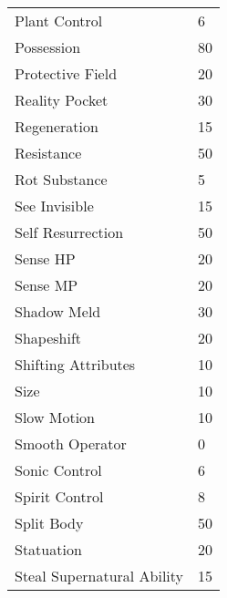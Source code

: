 \documentclass[twoside]{book}
\begin{document}
\begin{longtable}{p{1.25in}l}
  \raggedright
           Plant Control 
  &
   6 
  \tabularnewline
      
  \raggedright
           Possession 
  &
   80 
  \tabularnewline
      
  \raggedright
           Protective Field 
  &
   20 
  \tabularnewline
      
  \raggedright
           Reality Pocket 
  &
   30 
  \tabularnewline
      
  \raggedright
           Regeneration 
  &
   15 
  \tabularnewline
      
  \raggedright
           Resistance 
  &
   50 
  \tabularnewline
      
  \raggedright
           Rot Substance 
  &
   5 
  \tabularnewline
      
  \raggedright
           See Invisible 
  &
   15 
  \tabularnewline
      
  \raggedright
           Self Resurrection 
  &
   50 
  \tabularnewline
      
  \raggedright
           Sense HP 
  &
   20 
  \tabularnewline
      
  \raggedright
           Sense MP 
  &
   20 
  \tabularnewline
      
  \raggedright
           Shadow Meld 
  &
   30 
  \tabularnewline
      
  \raggedright
           Shapeshift 
  &
   20 
  \tabularnewline
      
  \raggedright
           Shifting Attributes 
  &
   10 
  \tabularnewline
      
  \raggedright
           Size 
  &
   10 
  \tabularnewline
      
  \raggedright
           Slow Motion 
  &
   10 
  \tabularnewline
      
  \raggedright
           Smooth Operator 
  &
   0 
  \tabularnewline
      
  \raggedright
           Sonic Control 
  &
   6 
  \tabularnewline
      
  \raggedright
           Spirit Control 
  &
   8 
  \tabularnewline
      
  \raggedright
           Split Body 
  &
   50 
  \tabularnewline
      
  \raggedright
           Statuation 
  &
   20 
  \tabularnewline
      
  \raggedright
           Steal Supernatural Ability
           
  &
   15 
  \tabularnewline
      

\end{longtable}
\end{document}

